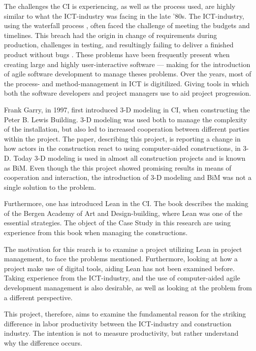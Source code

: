The challenges the CI is experiencing, as well as the process used, are highly similar to what the ICT-industry was facing in the late '80s. The ICT-industry, using the waterfall process \cite{royce}, often faced the challenge of meeting the budgets and timelines. This breach had the origin in change of requirements during production, challenges in testing, and resultingly failing to deliver a finished product without bugs \cite{boehm1987software}. These problems have been frequently present when creating large and highly user-interactive software — making for the introduction of agile software development to manage theses problems. Over the years, most of the process- and method-management in ICT is digitilized. Giving tools in which both the software developers and project managers use to aid project progression.  

Frank Garry, in 1997, first introduced 3-D modeling in CI, when constructing the Peter B. Lewis Building. 3-D modeling was used both to manage the complexity of the installation, but also led to increased cooperation between different parties within the project. The paper\cite{frank_gehry}, describing this project, is reporting a change in how actors in the construction react to using computer-aided constructions, in 3-D. Today 3-D modeling is used in almost all construction projects and is known as BiM. Even though the this project showed promising results in means of cooperation and interaction, the introduction of 3-D modeling and BiM was not a single solution to the problem.

Furthermore, one has introduced Lean in the CI. The book \cite{lean_i_praksis} describes the making of the Bergen Academy of Art and Design-building, where Lean was one of the essential strategies. The object of the Case Study in this research are using experience from this book when managing the constructions. 

The motivation for this rearch is to examine a project utilizing Lean in project management, to face the problems mentioned. Furthermore, looking at how a project make use of digital tools, aiding Lean has not been examined before. Taking experience from the ICT-industry, and the use of computer-aided agile development management is also desirable, as well as looking at the problem from a different perspective. 

This project, therefore, aims to examine the fundamental reason for the striking difference in labor productivity between the ICT-industry and construction industry. The intention is not to measure productivity, but rather understand why the difference occurs.

